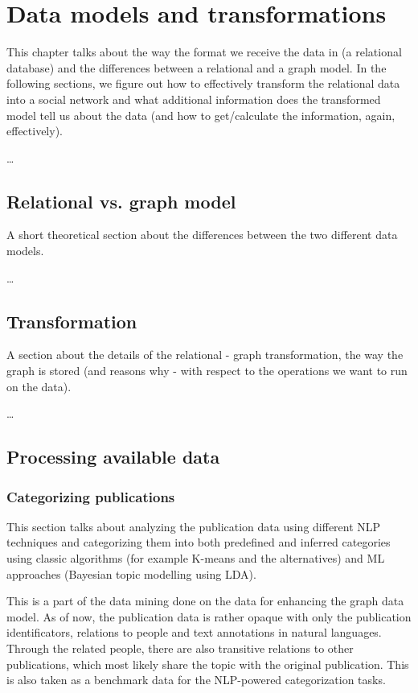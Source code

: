 \chapter{Data models and transformations}

This chapter talks about the way the format we receive the data in (a relational database) and the differences between a relational and a graph model. In the following sections, we figure out how to effectively transform the relational data into a social network and what additional information does the transformed model tell us about the data (and how to get/calculate the information, again, effectively).  

\dots

\section{Relational vs. graph model}

A short theoretical section about the differences between the two different data models.

\dots

\section{Transformation}

A section about the details of the relational - graph transformation, the way the graph is stored (and reasons why - with respect to the operations we want to run on the data).

\dots

\section{Processing available data}

\subsection{Categorizing publications}

This section talks about analyzing the publication data using different NLP techniques and categorizing them into both predefined and inferred categories using classic algorithms (for example K-means and the alternatives) and ML approaches (Bayesian topic modelling using LDA).

This is a part of the data mining done on the data for enhancing the graph data model. As of now, the publication data is rather opaque with only the publication identificators, relations to people and text annotations in natural languages. Through the related people, there are also transitive relations to other publications, which most likely share the topic with the original publication. This is also taken as a benchmark data for the NLP-powered categorization tasks.

